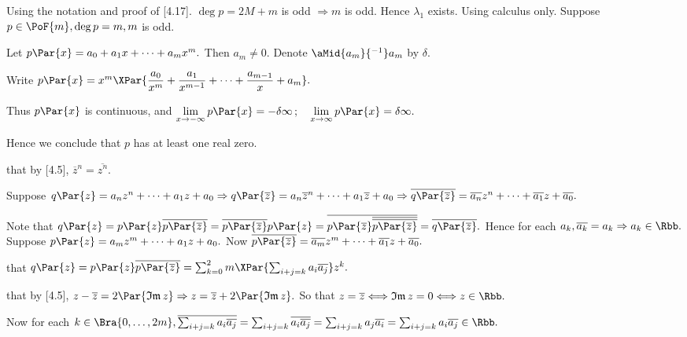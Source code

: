 \par\quad
Using the notation and proof of [4.17]. $\deg p=2M+m$ is odd $\Rightarrow m$ is odd. Hence $\lambda_1$ exists.\PfEnd\vspace{6pt}\quad
\Or Using calculus only. Suppose $p\in\PoF{m},\deg p=m,m$ is odd.\par\quad
Let $p\Par{x}=a_0+a_1 x+\dots+a_m x^m.$ Then $a_m\neq 0.$ Denote $\aMid{a_m}{^{-1}}a_m$ by $\delta.$\par\vspace{3pt}\quad
Write $p\Par{x}=x^m\XPar{\displaystyle\frac{a_0}{x^m}+\frac{a_1}{x^{m-1}}+\dots+\frac{a_{m-1}}{x}+a_m}.$\par\vspace{5pt}\quad
Thus $p\Par{x}$ is continuous, and $\lim\limits_{x\rightarrow -\infty}p\Par{x}=-\delta\infty\,;\quad\lim\limits_{x\rightarrow \infty}p\Par{x}=\delta\infty.$\par\quad
Hence we conclude that $p$ has at least one real zero.\PfEnd
\SepLine

\par\quad
\NOTICE that by [4.5], $\overline z{^n}=\overline{z^n}.$\par\quad
Suppose $q\Par{z}=a_n z^n+\dots+a_1 z+a_0\Rightarrow q\Par{\overline z}=a_n \overline z{^n}+\dots+a_1 \overline z+a_0\Rightarrow \overline{q\Par{\overline z}}=\overline{a_n}z^n+\dots+\overline{a_1}z+\overline{a_0}.$\vspace{8pt}\par\quad
Note that $q\Par{z}=p\Par{z}\overline{p\Par{\overline z}}=\overline{p\Par{\overline z}}p\Par{z}=\overline{p\Par{\overline z}\overline{\overline{p\Par{\overline z}}}}=\overline{q\Par{\overline z}}.$ Hence for each $a_k,\overline{a_k}=a_k\Rightarrow a_k\in\Rbb.$\PfEnd\vspace{14pt}\quad
\Or Suppose $p\Par{z}=a_m z^m+\dots+a_1z+a_0.$ Now $\overline{p\Par{\overline z}}=\overline{a_m} z^m+\dots+\overline{a_1}z+\overline{a_0}.$\vspace{4pt}\par\quad
\NOTICE that $q\Par{z}=p\Par{z}\overline{p\Par{\overline z}}=\sum_{k=0}^2m\XPar{\sum_{i+j=k}a_i\overline{a_j}}z^k.$\vspace{4pt}\par\quad
\NOTICE that by [4.5], $z-\overline z=2\Par{\mathfrak{Im}\,z}\Rightarrow z=\overline z+2\Par{\mathfrak{Im}\,z}.$ So that $z=\overline z\Longleftrightarrow\mathfrak{Im}\,z=0\Longleftrightarrow z\in\Rbb.$\vspace{4pt}\par\quad
Now for each $k\in\Bra{0,\dots,2m},\overline{\sum_{i+j=k}a_i\overline{a_j}}=\sum_{i+j=k}\overline{a_i\overline{a_j}}=\sum_{i+j=k}{a_j}\overline{a_i}=\sum_{i+j=k}a_i\overline{a_j}\in\Rbb.$\PfEnd
\SepLine\pagebreak


